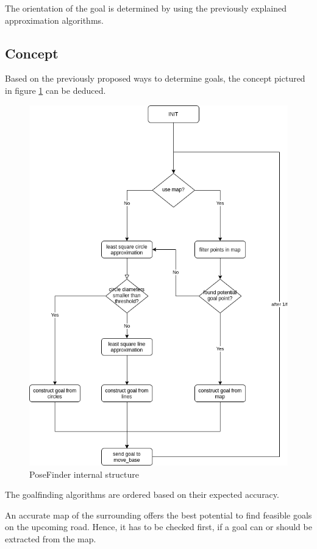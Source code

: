 The orientation of the goal is determined by using the previously explained approximation algorithms.

\subsection{Concept}

Based on the previously proposed ways to determine goals, the concept pictured in figure \ref{posefinder structure} can be deduced.\\

\begin{figure}[H]
	\centering
	\includegraphics[width=.9\textwidth]{Pictures/posefinder diagram}
	\caption{PoseFinder internal structure}
	\label{posefinder structure}
\end{figure}

The goalfinding algorithms are ordered based on their expected accuracy.

An accurate map of the surrounding offers the best potential to find feasible goals on the upcoming road. Hence, it has to be checked first, if a goal can or should be extracted from the map.

